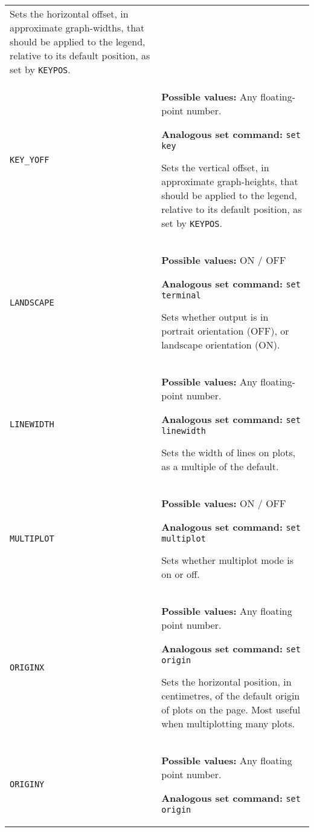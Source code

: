 \begin{longtable}{p{3.4cm}p{9cm}}
                   Sets the horizontal offset, in approximate graph-widths, that should be applied to the legend, relative to its default position, as set by {\tt KEYPOS}.
                   \\
{\tt KEY\_YOFF} & {\bf Possible values:} Any floating-point number.

                   {\bf Analogous set command:} {\tt set key}\index{set key command@{\tt set key} command}

                   Sets the vertical offset, in approximate graph-heights, that should be applied to the legend, relative to its default position, as set by {\tt KEYPOS}.
                   \\
{\tt LANDSCAPE} & {\bf Possible values:} ON / OFF

                   {\bf Analogous set command:} {\tt set terminal}\index{set terminal command@{\tt set terminal} command}

                   Sets whether output is in portrait orientation (OFF), or landscape orientation (ON).
                   \\
{\tt LINEWIDTH} & {\bf Possible values:} Any floating-point number.

                   {\bf Analogous set command:} {\tt set linewidth}\index{set linewidth command@{\tt set linewidth} command}

                   Sets the width of lines on plots, as a  multiple of the default.
                   \\
{\tt MULTIPLOT} & {\bf Possible values:} ON / OFF

                   {\bf Analogous set command:} {\tt set multiplot}\index{set multiplot command@{\tt set multiplot} command}

                   Sets whether multiplot mode is on or off.
                   \\
{\tt ORIGINX} & {\bf Possible values:} Any floating point number.

                   {\bf Analogous set command:} {\tt set origin}\index{set origin command@{\tt set origin} command}

                   Sets the horizontal position, in centimetres, of the default origin of plots on the page. Most useful when multiplotting many plots.
                   \\
{\tt ORIGINY} & {\bf Possible values:} Any floating point number.

                   {\bf Analogous set command:} {\tt set origin}\index{set origin command@{\tt set origin} command}


\end{longtable}
